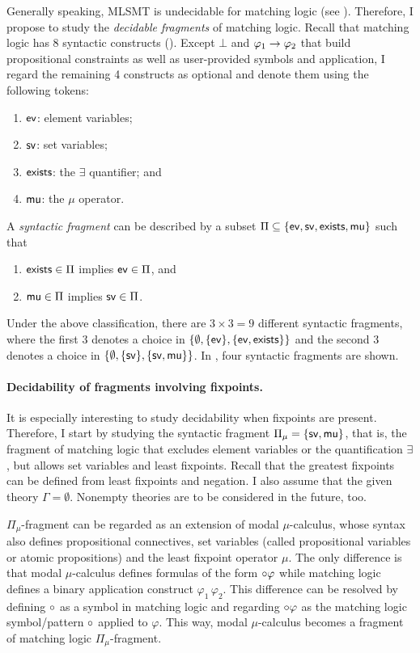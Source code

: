\documentclass[11pt]{article}
\begin{document}
Generally speaking, MLSMT is undecidable for matching logic 
(see ). 
Therefore, I propose to study 
the \emph{decidable fragments} of matching logic. 
Recall that matching logic has 8 syntactic constructs ().
Except $\bot$ and $\varphi_1 \to \varphi_2$ that build propositional 
constraints as well as user-provided symbols and application, I regard the remaining 4 constructs as optional and denote them using the following tokens:
\begin{enumerate}
\item \(\mathsf{ev}\): element variables;
\item \(\mathsf{sv}\): set variables;
\item \(\mathsf{exists}\): the $\exists$ quantifier; and
\item \(\mathsf{mu}\): the $\mu$ operator.
\end{enumerate}
A \emph{syntactic fragment} can be described by a subset 
$\Pi \subseteq \{ \mathsf{ev}, \mathsf{sv}, \mathsf{exists}, \mathsf{mu} \}$ such that
\begin{enumerate}
\item $\mathsf{exists} \in \Pi$ implies $\mathsf{ev} \in \Pi$, and
\item $\mathsf{mu} \in \Pi$ implies $\mathsf{sv} \in \Pi$. 
\end{enumerate}
Under the above classification,
there are $3 \times 3 = 9$ different syntactic fragments,
where the first $3$ denotes a choice in
$\{ \emptyset, \{\mathsf{ev}\}, \{\mathsf{ev},\mathsf{exists}\}\}$ and
the second $3$ denotes a choice in
$\{ \emptyset, \{\mathsf{sv}\}, \{\mathsf{sv},\mathsf{mu}\}\}$.
In , four syntactic fragments are shown. 

\paragraph{Decidability of fragments involving fixpoints.}

It is especially interesting to study decidability when fixpoints are present.
Therefore, I start by studying the
syntactic fragment $\Pi_\mu = \{\mathsf{sv}, \mathsf{mu} \}$, that is, the fragment of 
matching logic that excludes element variables or the quantification $\exists$,
but allows set variables and least fixpoints. 
Recall that the greatest fixpoints can be defined from least fixpoints and 
negation. 
I also assume that the given theory $\Gamma = \emptyset$. 
Nonempty theories are to be considered in the future, too.

$\Pi_\mu$-fragment can be regarded as an extension of modal $\mu$-calculus, 
whose syntax also 
defines propositional connectives, set variables (called propositional 
variables or atomic propositions) and the least fixpoint operator $\mu$.
The only difference is that modal $\mu$-calculus defines
formulas of the form $\circ \varphi$ while matching logic defines a binary 
application construct $\varphi_1 \, \varphi_2$. 
This difference can be resolved by defining $\circ$ as a symbol in matching 
logic and regarding $\circ \varphi$ as the matching logic symbol/pattern 
$\circ$ applied to $\varphi$. This way, modal $\mu$-calculus becomes a 
fragment of matching logic $\Pi_\mu$-fragment.
\end{document}
